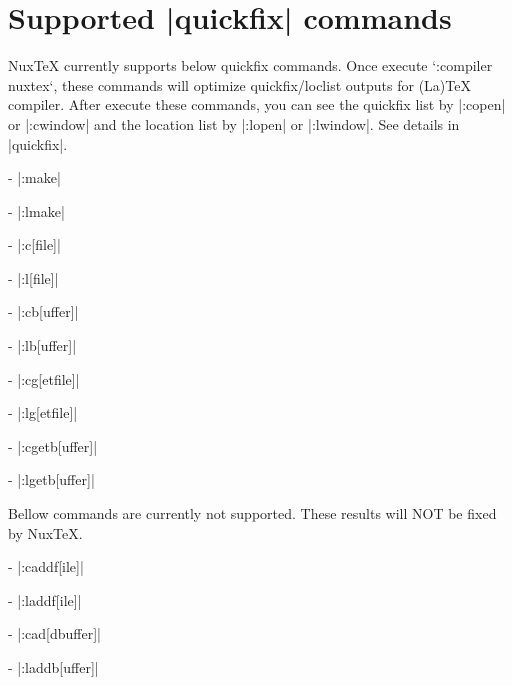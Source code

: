 \section{Supported |quickfix| commands}

NuxTeX currently supports below quickfix commands. Once execute `:compiler nuxtex`, these commands will optimize quickfix/loclist outputs for (La)TeX compiler. After execute these commands, you can see the quickfix list by |:copen| or |:cwindow| and the location list by |:lopen| or |:lwindow|.
See details in |quickfix|.

- |:make|

- |:lmake|

- |:c[file]|

- |:l[file]|

- |:cb[uffer]|

- |:lb[uffer]|

- |:cg[etfile]|

- |:lg[etfile]|

- |:cgetb[uffer]|

- |:lgetb[uffer]|

Bellow commands are currently not supported. These results will NOT be fixed by NuxTeX.

- |:caddf[ile]|

- |:laddf[ile]|

- |:cad[dbuffer]|

- |:laddb[uffer]|

